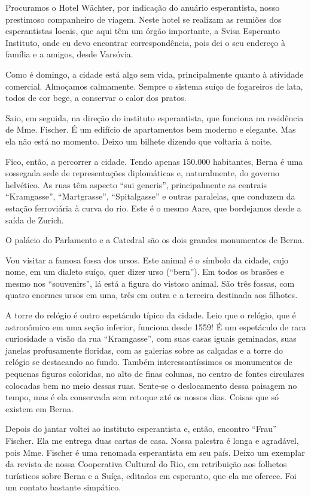 Procuramos o Hotel Wächter, por indicação do anuário esperantista, nosso prestimoso companheiro de viagem. Neste hotel se realizam as reuniões dos esperantistas locais, que aqui têm um órgão importante, a Svisa Esperanto Instituto, onde eu devo encontrar correspondência, pois dei o seu endereço à família e a amigos, desde Varsóvia.

Como é domingo, a cidade está algo sem vida, principalmente quanto à atividade comercial. Almoçamos calmamente. Sempre o sistema suíço de fogareiros de lata, todos de cor bege, a conservar o calor dos pratos.

Saio, em seguida, na direção do instituto esperantista, que funciona na residência de Mme. Fischer. É um edifício de apartamentos bem moderno e elegante. Mas ela não está no momento. Deixo um bilhete dizendo que voltaria à noite.

Fico, então, a percorrer a cidade. Tendo apenas 150.000 habitantes, Berna é uma sossegada sede de representações diplomáticas e, naturalmente, do governo helvético. As ruas têm aspecto “sui generis”, principalmente as centrais “Kramgasse”, “Martgrasse”, “Spitalgasse” e outras paralelas, que conduzem da estação ferroviária à curva do rio. Este é o mesmo Aare, que bordejamos desde a saída de Zurich.

O palácio do Parlamento e a Catedral são os dois grandes monumentos de Berna.

Vou visitar a famosa fossa dos ursos. Este animal é o símbolo da cidade, cujo nome, em um dialeto suíço, quer dizer urso (“bern”). Em todos os brasões e mesmo nos “souvenirs”, lá está a figura do vistoso animal. São três fossas, com quatro enormes ursos em uma, três em outra e a terceira destinada aos filhotes.

A torre do relógio é outro espetáculo típico da cidade. Leio que o relógio, que é astronômico em uma seção inferior, funciona desde 1559! É um espetáculo de rara curiosidade a visão da rua “Kramgasse”, com suas casas iguais geminadas, suas janelas profusamente floridas, com as galerias sobre as calçadas e a torre do relógio se destacando ao fundo. Também interessantíssimos os monumentos de pequenas figuras coloridas, no alto de finas colunas, no centro de fontes circulares colocadas bem no meio dessas ruas. Sente-se o deslocamento dessa paisagem no tempo, mas é ela conservada sem retoque até os nossos dias. Coisas que só existem em Berna.

Depois do jantar voltei ao instituto esperantista e, então, encontro “Frau” Fischer. Ela me entrega duas cartas de casa. Nossa palestra é longa e agradável, pois Mme. Fischer é uma renomada esperantista em seu país. Deixo um exemplar da revista de nossa Cooperativa Cultural do Rio, em retribuição aos folhetos turísticos sobre Berna e a Suíça, editados em esperanto, que ela me oferece. Foi um contato bastante simpático.

